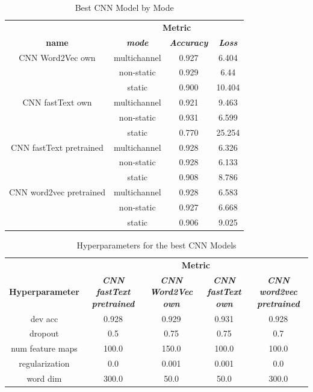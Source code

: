 \documentclass[conference]{IEEEtran}
\begin{document}
\begin{table}[htbp]
\caption{Best CNN Model by Mode}
\begin{center}
\begin{tabular}{|c|c|c|c|}
\hline
\textbf{}&\multicolumn{3}{|c|}{\textbf{Metric}} \\ 
\cline{2-4}
\textbf{name} & \textbf{\textit{mode}}& \textbf{\textit{Accuracy}}& \textbf{\textit{Loss}} \\ 
\hline
CNN Word2Vec own & multichannel & 0.927 & 6.404 \\ 
\cline{2-4}
 & non-static & 0.929 & 6.44 \\ 
\cline{2-4}
 & static & 0.900 & 10.404 \\ 
\hline
CNN fastText own & multichannel & 0.921 & 9.463 \\ 
\cline{2-4}
 & non-static & 0.931 & 6.599 \\ 
\cline{2-4}
& static & 0.770 & 25.254 \\ 
\hline
CNN fastText pretrained & multichannel & 0.928 & 6.326 \\ 
\cline{2-4}
 & non-static & 0.928 & 6.133 \\ 
\cline{2-4}
 & static & 0.908 & 8.786 \\ 
\hline
CNN word2vec pretrained & multichannel & 0.928 & 6.583 \\ 
\cline{2-4}
& non-static & 0.927 & 6.668 \\ 
\cline{2-4}
& static & 0.906 & 9.025 \\ 
\hline
\end{tabular}
\label{tab2}
\end{center}
\end{table}

\begin{table}[htbp]
\caption{Hyperparameters for the best CNN Models}
\begin{center}
\begin{tabular}{|c|c|c|c|c|}
\hline
\textbf{}&\multicolumn{4}{|c|}{\textbf{Metric}} \\ 
\cline{2-5}
\textbf{Hyperparameter} & \textbf{\textit{CNN fastText pretrained}}& \textbf{\textit{CNN Word2Vec own}}& \textbf{\textit{CNN fastText own}}& \textbf{\textit{CNN word2vec pretrained}} \\ 
\hline
dev acc & 0.928 & 0.929 & 0.931 & 0.928 \\ 
\hline
dropout & 0.5 & 0.75 & 0.75 & 0.7 \\ 
\hline
num feature maps & 100.0 & 150.0 & 100.0 & 100.0 \\ 
\hline
regularization & 0.0 & 0.001 & 0.001 & 0.0 \\ 
\hline
word dim & 300.0 & 50.0 & 50.0 & 300.0 \\ 
\hline
\end{tabular}
\label{tab4}
\end{center}
\end{table}
\end{document}
